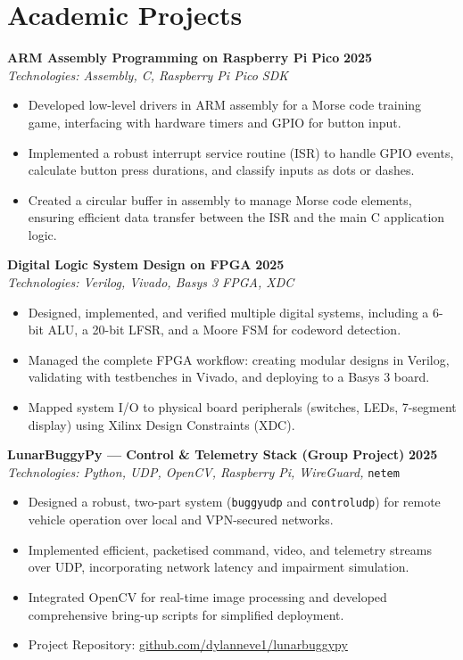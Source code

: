 \documentclass[10pt,a4paper]{article}
\begin{document}
\section*{Academic Projects}
\textbf{ARM Assembly Programming on Raspberry Pi Pico} \hfill \textbf{2025} \\
\textit{Technologies: Assembly, C, Raspberry Pi Pico SDK}
\begin{itemize}
    \item Developed low-level drivers in ARM assembly for a Morse code training game, interfacing with hardware timers and GPIO for button input.
    \item Implemented a robust interrupt service routine (ISR) to handle GPIO events, calculate button press durations, and classify inputs as dots or dashes.
    \item Created a circular buffer in assembly to manage Morse code elements, ensuring efficient data transfer between the ISR and the main C application logic.
\end{itemize}
\medskip
\textbf{Digital Logic System Design on FPGA} \hfill \textbf{2025} \\
\textit{Technologies: Verilog, Vivado, Basys 3 FPGA, XDC}
\begin{itemize}
    \item Designed, implemented, and verified multiple digital systems, including a 6-bit ALU, a 20-bit LFSR, and a Moore FSM for codeword detection.
    \item Managed the complete FPGA workflow: creating modular designs in Verilog, validating with testbenches in Vivado, and deploying to a Basys 3 board.
    \item Mapped system I/O to physical board peripherals (switches, LEDs, 7-segment display) using Xilinx Design Constraints (XDC).
\end{itemize}
\medskip
\textbf{LunarBuggyPy --- Control \& Telemetry Stack (Group Project)} \hfill \textbf{2025} \\
\textit{Technologies: Python, UDP, OpenCV, Raspberry Pi, WireGuard,} \texttt{netem}
\begin{itemize}
    \item Designed a robust, two-part system (\texttt{buggyudp} and \texttt{controludp}) for remote vehicle operation over local and VPN-secured networks.
    \item Implemented efficient, packetised command, video, and telemetry streams over UDP, incorporating network latency and impairment simulation.
    \item Integrated OpenCV for real-time image processing and developed comprehensive bring-up scripts for simplified deployment.
    \item Project Repository: \href{https://github.com/dylanneve1/lunarbuggypy}{github.com/dylanneve1/lunarbuggypy}
\end{itemize}
\end{document}
